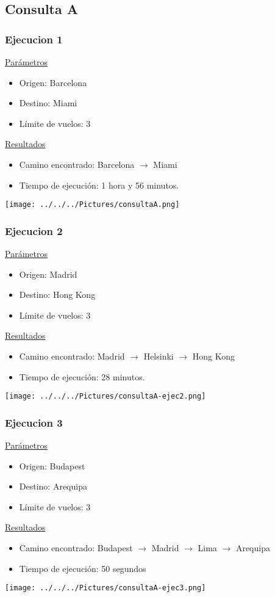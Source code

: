 \documentclass[a4paper,11pt]{article}
\begin{document}
\subsection*{Consulta A}
\subsubsection*{Ejecucion 1}
\noindent
\underline{Parámetros}
\begin{itemize}
\item Origen: Barcelona
\item Destino: Miami
\item Límite de vuelos: 3
\end{itemize}
\underline{Resultados}
\begin{itemize}
\item Camino encontrado: Barcelona $\rightarrow$ Miami
\item Tiempo de ejecución: 1 hora y 56 minutos.
\end{itemize}
\begin{center}
\texttt{[image: ../../../Pictures/consultaA.png]}
\end{center}

\subsubsection*{Ejecucion 2}
\noindent
\underline{Parámetros}
\begin{itemize}
\item Origen: Madrid
\item Destino: Hong Kong
\item Límite de vuelos: 3
\end{itemize}
\underline{Resultados}
\begin{itemize}
\item Camino encontrado: Madrid $\rightarrow$ Helsinki $\rightarrow$ Hong Kong
\item Tiempo de ejecución: 28 minutos.
\end{itemize}
\begin{center}
\texttt{[image: ../../../Pictures/consultaA-ejec2.png]}
\end{center}

\subsubsection*{Ejecucion 3}
\noindent
\underline{Parámetros}
\begin{itemize}
\item Origen: Budapest
\item Destino: Arequipa
\item Límite de vuelos: 3
\end{itemize}
\underline{Resultados}
\begin{itemize}
\item Camino encontrado: Budapest $\rightarrow$ Madrid $\rightarrow$ Lima $\rightarrow$ Arequipa
\item Tiempo de ejecución: 50 segundos
\end{itemize}
\begin{center}
\texttt{[image: ../../../Pictures/consultaA-ejec3.png]}
\end{center}
\end{document}
